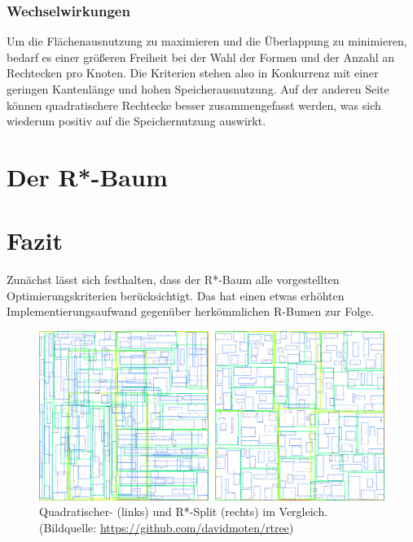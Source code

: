 \documentclass[runningheads,a4paper]{llncs}
\begin{document}
{	%

	\subsubsection{Wechselwirkungen} %
	\label{ssub:wechselwirkungen}

	Um die Flächenausnutzung zu maximieren und die Überlappung zu minimieren, bedarf es einer größeren Freiheit bei der Wahl der Formen und der Anzahl an Rechtecken pro Knoten. Die Kriterien stehen also in Konkurrenz mit einer geringen Kantenlänge und hohen Speicherausnutzung. Auf der anderen Seite können quadratischere Rechtecke besser zusammengefasst werden, was sich wiederum positiv auf die Speichernutzung auswirkt. \citep[vgl.][323-324]{Beckmann:1990}
	


\section{Der R*-Baum} %
\label{sec:rstar_tree}




\section{Fazit} %
\label{sec:fazit}

	Zunächst lässt sich festhalten, dass der R*-Baum alle vorgestellten Optimierungskriterien berücksichtigt. Das hat einen etwas erhöhten Implementierungsaufwand gegenüber herkömmlichen R-Bumen zur Folge.

	\begin{figure}[H]
		\centering
		\includegraphics[width=1\textwidth]{vergleich-quad-star.png}
		\caption{Quadratischer- (links) und R*-Split (rechts) im Vergleich. (Bildquelle: \url{https://github.com/davidmoten/rtree})}
		\label{fig:vergleich-quad-star}
	\end{figure}

}
\end{document}
